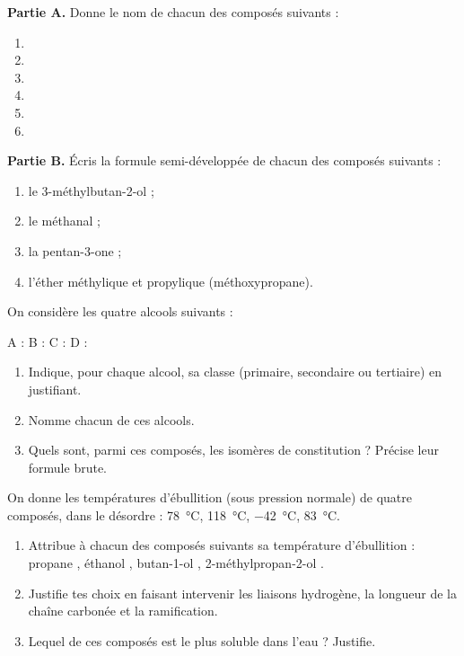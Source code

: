 \documentclass[11pt]{article}
\newcounter{popsec}
\newcounter{popsub}
\newcommand{\courssub}[1]{%
  \stepcounter{popsub}%
  \par\vspace{9pt}\noindent{\popxbold\fontsize{11.5}{13}\selectfont\color{popink}{\color{poporange}\thepopsec.\thepopsub}\hspace{6pt}#1}\par\nopagebreak\vspace{4pt}
}
\begin{document}
\courssub{Je m'entraîne}

\begin{exercice}
\textbf{Partie A.} Donne le nom de chacun des composés suivants :
\begin{enumerate}
\item {}
\item {}
\item {}
\item {}
\item {}
\item {}
\end{enumerate}
\textbf{Partie B.} Écris la formule semi-développée de chacun des composés suivants :
\begin{enumerate}
\item le 3-méthylbutan-2-ol ;
\item le méthanal ;
\item la pentan-3-one ;
\item l'éther méthylique et propylique (méthoxypropane).
\end{enumerate}
\end{exercice}

\begin{exercice}
On considère les quatre alcools suivants :
\begin{center}
A :  \qquad
B :  \qquad
C :  \qquad
D : 
\end{center}
\begin{enumerate}
\item Indique, pour chaque alcool, sa classe (primaire, secondaire ou tertiaire) en justifiant.
\item Nomme chacun de ces alcools.
\item Quels sont, parmi ces composés, les isomères de constitution ? Précise leur formule brute.
\end{enumerate}
\end{exercice}

\begin{exercice}
On donne les températures d'ébullition (sous pression normale) de quatre composés, dans le désordre : \SI{78}{\celsius}, \SI{118}{\celsius}, \SI{-42}{\celsius}, \SI{83}{\celsius}.
\begin{enumerate}
\item Attribue à chacun des composés suivants sa température d'ébullition : propane , éthanol , butan-1-ol , 2-méthylpropan-2-ol .
\item Justifie tes choix en faisant intervenir les liaisons hydrogène, la longueur de la chaîne carbonée et la ramification.
\item Lequel de ces composés est le plus soluble dans l'eau ? Justifie.
\end{enumerate}
\end{exercice}
\end{document}
